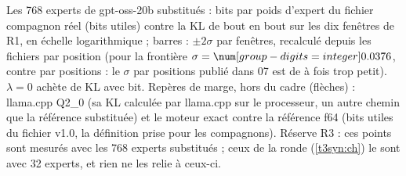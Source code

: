   {Les 768 experts de gpt-oss-20b substitués : bits par poids d'expert du fichier compagnon réel (bits utiles)
   contre la KL de bout en bout sur les dix fenêtres de R1, en échelle logarithmique ; barres : $\pm2\sigma$ par
   fenêtres, recalculé depuis les fichiers par position (pour la frontière $\sigma=\CodonNum{\SynoNVarFSf}$, contre
   \CodonNum{\SynoNVarFSn} par positions : le $\sigma$ par positions publié dans 07 est de
   \CodonNum{\SynoNSigmaRapportMin} à \CodonNum{\SynoNSigmaRapportMax} fois trop petit). $\lambda=0$ achète
   \CodonNum{\SynoNAchatKL} de KL avec \CodonNum{\SynoNAchatBits} bit. Repères de marge, hors du cadre (flèches) :
   llama.cpp Q2\_0 (sa KL calculée par llama.cpp sur le processeur, un autre chemin que la référence substituée) et
   le moteur exact contre la référence f64 (bits utiles du fichier v1.0, la définition prise pour les compagnons).
   Réserve R3 : ces points sont mesurés avec les 768 experts substitués ; ceux de la ronde (\cref{t3syn:ch}) le sont avec 32
   experts, et rien ne les relie à ceux-ci.}
\fi
